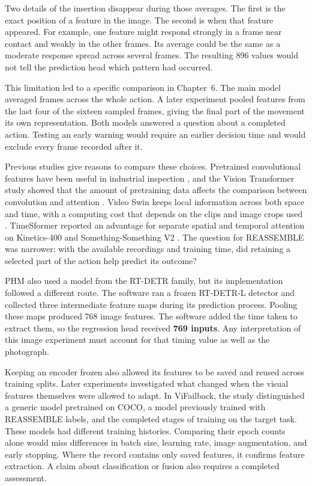 Two details of the insertion disappear during those averages. The first is the exact
position of a feature in the image. The second is when that feature appeared. For
example, one feature might respond strongly in a frame near contact and weakly in the
other frames. Its average could be the same as a moderate response spread across several
frames. The resulting 896 values would not tell the prediction head which pattern had
occurred.

This limitation led to a specific comparison in Chapter~6. The main model averaged
frames across the whole action. A later experiment pooled features from the last four of
the sixteen sampled frames, giving the final part of the movement its own
representation. Both models answered a question about a completed action. Testing an
early warning would require an earlier decision time and would exclude every frame
recorded after it.

Previous studies give reasons to compare these choices. Pretrained convolutional
features have been useful in industrial inspection \parencite{Roth2022Towards}, and the
Vision Transformer study showed that the amount of pretraining data affects the
comparison between convolution and attention \parencite{P010}. Video Swin keeps local
information across both space and time, with a computing cost that depends on the clips
and image crops used \parencite{P013}. TimeSformer reported an advantage for separate
spatial and temporal attention on Kinetics-400 and Something-Something V2
\parencite[Table~1]{P034}. The question for REASSEMBLE was narrower: with the available
recordings and training time, did retaining a selected part of the action help predict
its outcome?

PHM also used a model from the RT-DETR family, but its implementation followed a
different route. The software ran a frozen RT-DETR-L detector and collected three
intermediate feature maps during its prediction process. Pooling these maps produced 768
image features. The software added the time taken to extract them, so the regression
head received \textbf{769 inputs}. Any interpretation of this image experiment must
account for that timing value as well as the photograph.

Keeping an encoder frozen also allowed its features to be saved and reused across
training splits. Later experiments investigated what changed when the visual features
themselves were allowed to adapt. In ViFailback, the study distinguished a generic model
pretrained on COCO, a model previously trained with REASSEMBLE labels, and the completed
stages of training on the target task. These models had different training histories.
Comparing their epoch counts alone would miss differences in batch size, learning rate,
image augmentation, and early stopping. Where the record contains only saved features,
it confirms feature extraction. A claim about classification or fusion also requires a
completed assessment.

